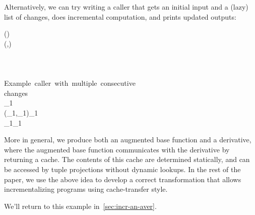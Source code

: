 Alternatively, we can try writing a caller that gets an initial input and a
(lazy) list of changes, does incremental computation, and prints updated
outputs:
\begin{hscode}\SaveRestoreHook
{}%
%
%
%
\>[B]{}\;(\typcolon{})\;\;\mathrel{=}\<[E]%
\\
\>[B]{}\<[3]%
\>[3]{}\;(,)\mathrel{=}\;\;\<[E]%
\\
\>[3]{}\<[7]%
\>[7]{}\mathrel{=}\oplus {}\<[E]%
\\
\>[B]{}\<[3]%
\>[3]{}\;\<[E]%
\\
\>[B]{}\<[3]%
\>[3]{}\;\;\;\<[E]%
\\[\blanklineskip]%
\>[B]{}\mbox{\onelinecomment  Example caller with multiple consecutive}{}\<[E]%
\\
\>[B]{}\mbox{\onelinecomment  changes}{}\<[E]%
\\
\>[B]{}\;_{1}\;\mathrel{=}\<[E]%
\\
\>[B]{}\<[3]%
\>[3]{}\;(_{1},_{1})\mathrel{=}\;_{1}{}\<[E]%
\\
\>[B]{}\<[3]%
\>[3]{}\;\;_{1}\;_{1}{}\<[E]%
\ColumnHook
\end{hscode}\resethooks

More in general, we produce both an augmented base function and a derivative,
where the augmented base function communicates with the derivative by returning
a cache. The contents of this cache are determined statically, and can be
accessed by tuple projections without dynamic lookups.
In the rest of the paper, we use the above idea to develop a correct
transformation that allows incrementalizing programs using cache-transfer style.

We'll return to this example in~\cref{sec:incr-an-aver}.

